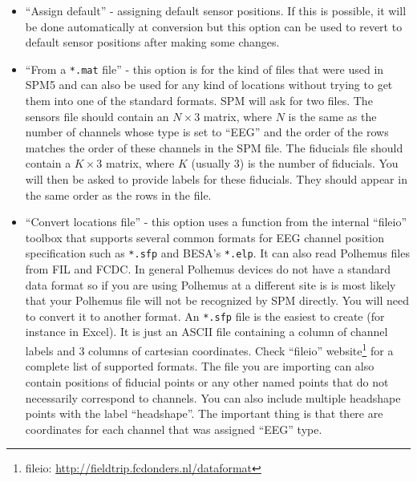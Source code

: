 \begin{itemize}
\item	``Assign default'' - assigning default sensor positions. If this is possible, it will be done automatically at conversion but this option can be used to revert to default sensor positions after making some changes.

\item ``From a \texttt{*.mat} file'' - this option is for the kind of files that were used in SPM5 and can also be used for any kind of locations without trying to get them into one of the standard formats. SPM will ask for two files. The sensors file should contain an $N \times 3$ matrix, where $N$ is the same as the number of channels whose type is set to ``EEG'' and the order of the rows matches the order of these channels in the SPM file. The fiducials file should contain a $K \times 3$ matrix, where $K$ (usually 3) is the number of fiducials. You will then be asked to provide labels for these fiducials. They should appear in the same order as the rows in the file.

\item	``Convert locations file'' - this option uses a function from the internal ``fileio'' toolbox that supports several common formats for EEG channel position specification such as \texttt{*.sfp} and BESA's \texttt{*.elp}. It can also read Polhemus files from FIL and FCDC. In general Polhemus devices do not have a standard data format so if you are using Polhemus at a different site is is most likely that your Polhemus file will not be recognized by SPM directly. You will need to convert it to another format. An \texttt{*.sfp} file is the easiest to create (for instance in Excel). It is just an ASCII file containing a column of channel labels and 3 columns of cartesian coordinates. Check ``fileio'' website\footnote{fileio: \url{http://fieldtrip.fcdonders.nl/dataformat}} for a complete list of supported formats. The file you are importing can also contain positions of fiducial points or any other named points that do not necessarily correspond to channels. You can also include multiple headshape points with the label ``headshape''. The important thing is that there are coordinates for each channel that was assigned ``EEG'' type.

\end{itemize}

